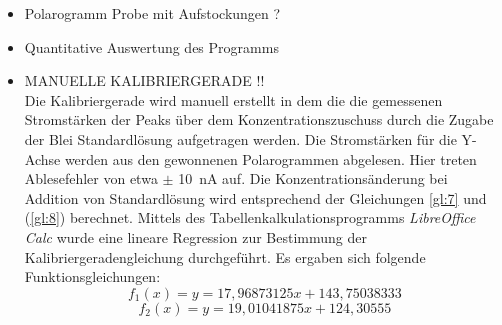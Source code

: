 \begin{itemize}
	\item  Polarogramm Probe mit Aufstockungen ?
	\item  Quantitative Auswertung des Programms
	\item  MANUELLE KALIBRIERGERADE !!\\
	Die Kalibriergerade wird manuell erstellt in dem die die gemessenen Stromstärken der Peaks über dem Konzentrationszuschuss durch die Zugabe der Blei Standardlösung aufgetragen werden. Die Stromstärken für die Y-Achse werden aus den gewonnenen Polarogrammen abgelesen. Hier treten Ablesefehler von etwa $\pm$ \SI{10}{\nano\ampere} auf. Die Konzentrationsänderung bei Addition von Standardlösung wird entsprechend der Gleichungen \ref{gl:7} und (\ref{gl:8}) berechnet. Mittels des Tabellenkalkulationsprogramms \textit{LibreOffice Calc} wurde eine lineare Regression zur Bestimmung der Kalibriergeradengleichung durchgeführt. Es ergaben sich folgende Funktionsgleichungen:
	$$f_1(x)=y=17,96873125 x + 143,75038333 $$
	$$f_2(x)=y=19,01041875 x + 124,30555 $$
	
	\begin{figure}[h!]
		\begin{center}
\end{center}
\end{figure}
\end{itemize}
